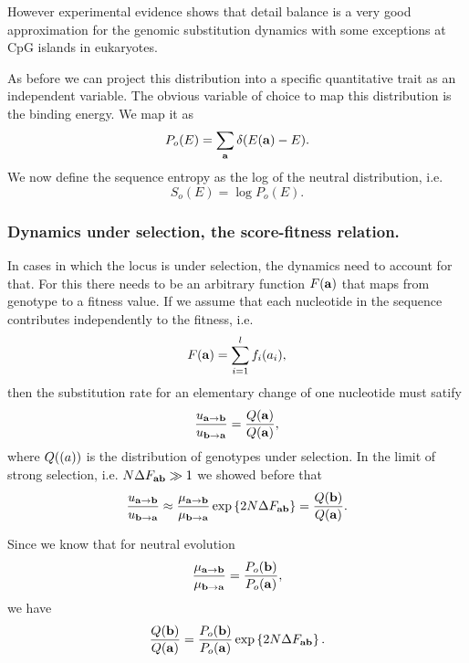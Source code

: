 However experimental evidence shows that detail balance is a very good
approximation for the genomic substitution dynamics with some exceptions at CpG
islands in eukaryotes.

As before we can project this distribution into a specific quantitative trait as
an independent variable. The obvious variable of choice to map this distribution
is the binding energy. We map it as
\begin{equation}
  P_o(E) = \sum_{\mathbf{a}} \delta (E(\mathbf{a}) - E).
\end{equation}
We now define the sequence entropy as the log of the neutral distribution, i.e.
\begin{equation}
  S_o(E) = \log P_o (E).
\end{equation}

\subsubsection{Dynamics under selection, the score-fitness relation.}

In cases in which the locus is under selection, the dynamics need to account for
that. For this there needs to be an arbitrary function $F(\mathbf{a})$ that maps
from genotype to a fitness value. If we assume that each nucleotide in the
sequence contributes independently to the fitness, i.e.
\begin{equation}
  F(\mathbf{a}) = \sum_{i = 1}^l f_i (a_i),
\end{equation}
then the substitution rate for an elementary change of one nucleotide must
satify
\begin{equation}
  {u_{\mathbf{a} \rightarrow \mathbf{b}}\over u_{\mathbf{b} \rightarrow \mathbf{a}}} = {Q (\mathbf{a}) \over Q(\mathbf{a})},
\end{equation}
where $Q(\mathbf{(}a))$ is the distribution of genotypes under selection. In the
limit of strong selection, i.e. $N \Delta F_{\mathbf{ab}} \gg 1$ we showed before that
\begin{equation}
  {u_{\mathbf{a} \rightarrow \mathbf{b}}\over u_{\mathbf{b} \rightarrow \mathbf{a}}} \approx {\mu_{\mathbf{a} \rightarrow \mathbf{b}}\over \mu_{\mathbf{b} \rightarrow \mathbf{a}}}
  \exp \left\{ 2 N \Delta F_{\mathbf{ab}} \right\} = {Q(\mathbf{b}) \over Q(\mathbf{a})}.
\end{equation}

Since we know that for neutral evolution
\begin{equation}
  {\mu_{\mathbf{a} \rightarrow \mathbf{b}}\over \mu_{\mathbf{b} \rightarrow \mathbf{a}}} = {P_o(\mathbf{b}) \over P_o(\mathbf{a})},
\end{equation}
we have
\begin{equation}
  {Q(\mathbf{b}) \over Q(\mathbf{a})} = {P_o(\mathbf{b}) \over P_o(\mathbf{a})}
  \exp \left\{ 2 N \Delta F_{\mathbf{ab}} \right\}.
\end{equation}

